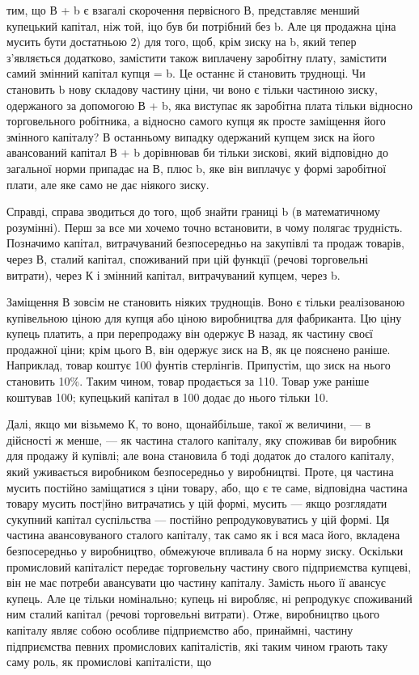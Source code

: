 \parcont{}  %
тим, що В + b є взагалі скорочення первісного В, представляє
менший купецький капітал, ніж той, іцо був би потрібний без b.
Але ця продажна ціна мусить бути достатньою 2) для того, щоб,
крім зиску на b, який тепер з’являється додатково, замістити також
виплачену заробітну плату, замістити самий змінний капітал
купця = b. Це останнє й становить труднощі. Чи становить b
нову складову частину ціни, чи воно є тільки частиною зиску,
одержаного за допомогою В + b, яка виступає як заробітна плата
тільки відносно торговельного робітника, а відносно самого
купця як просте заміщення його змінного капіталу? В останньому
випадку одержаний купцем зиск на його авансований капітал
В + b дорівнював би тільки зискові, який відповідно до загальної
норми припадає на В, плюс b, яке він виплачує у формі
заробітної плати, але яке само не дає ніякого зиску.

Справді, справа зводиться до того, щоб знайти границі b (в математичному
розумінні). Перш за все ми хочемо точно встановити,
в чому полягає трудність. Позначимо капітал, витрачуваний безпосередньо
на закупівлі та продаж товарів, через В, сталий капітал,
споживаний при цій функції (речові торговельні витрати),
через К і змінний капітал, витрачуваний купцем, через b.

Заміщення В зовсім не становить ніяких труднощів. Воно є
тільки реалізованою купівельною ціною для купця або ціною
виробництва для фабриканта. Цю ціну купець платить, а при
перепродажу він одержує В назад, як частину своєї продажної
ціни; крім цього В, він одержує зиск на В, як це пояснено раніше.
Наприклад, товар коштує 100 фунтів стерлінгів. Припустім, що зиск
на нього становить 10\%. Таким чином, товар продається за
110. Товар уже раніше коштував 100; купецький капітал в 100
додає до нього тільки 10.

Далі, якщо ми візьмемо К, то воно, щонайбільше, такої ж
величини, — в дійсності ж менше, — як частина сталого капіталу,
яку споживав би виробник для продажу й купівлі; але вона становила
б тоді додаток до сталого капіталу, який уживається виробником
безпосередньо у виробництві. Проте, ця частина мусить
постійно заміщатися з ціни товару, або, що є те саме, відповідна
частина товару мусить пост|йно витрачатись у цій формі, мусить
— якщо розглядати сукупний капітал суспільства — постійно
репродуковуватись у цій формі. Ця частина авансовуваного сталого
капіталу, так само як і вся маса його, вкладена безпосередньо
у виробництво, обмежуюче впливала б на норму зиску. Оскільки
промисловий капіталіст передає торговельну частину свого підприємства
купцеві, він не має потреби авансувати цю частину
капіталу. Замість нього її авансує купець. Але це тільки номінально;
купець ні виробляє, ні репродукує споживаний ним сталий
капітал (речові торговельні витрати). Отже, виробництво
цього капіталу являє собою особливе підприємство або, принаймні,
частину підприємства певних промислових капіталістів, які таким
чином грають таку саму роль, як промислові капіталісти, що
\parbreak{}  %
